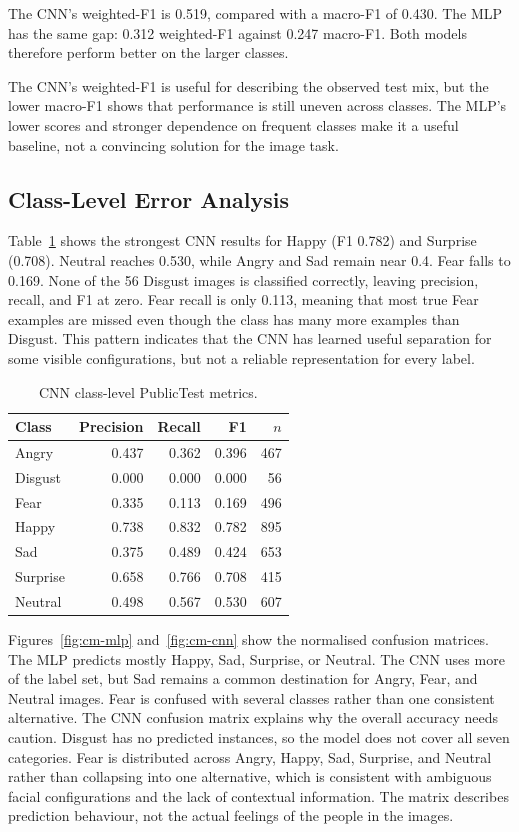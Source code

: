\documentclass[10pt,twocolumn]{article}
\begin{document}
The CNN's weighted-F1 is 0.519, compared with a macro-F1 of 0.430. The MLP has the same gap: 0.312 weighted-F1 against 0.247 macro-F1. Both models therefore perform better on the larger classes.

The CNN's weighted-F1 is useful for describing the observed test mix, but the lower macro-F1 shows that performance is still uneven across classes. The MLP's lower scores and stronger dependence on frequent classes make it a useful baseline, not a convincing solution for the image task.

\subsection{Class-Level Error Analysis}

Table~\ref{tab:perclass} shows the strongest CNN results for Happy (F1 0.782) and Surprise (0.708). Neutral reaches 0.530, while Angry and Sad remain near 0.4. Fear falls to 0.169. None of the 56 Disgust images is classified correctly, leaving precision, recall, and F1 at zero. Fear recall is only 0.113, meaning that most true Fear examples are missed even though the class has many more examples than Disgust. This pattern indicates that the CNN has learned useful separation for some visible configurations, but not a reliable representation for every label.
\begin{table}[t]
\centering
\caption{CNN class-level PublicTest metrics.}
\label{tab:perclass}
\begin{tabular}{lrrrr}
\toprule
Class & Precision & Recall & F1 & $n$ \\
\midrule
Angry & 0.437 & 0.362 & 0.396 & 467 \\
Disgust & 0.000 & 0.000 & 0.000 & 56 \\
Fear & 0.335 & 0.113 & 0.169 & 496 \\
Happy & 0.738 & 0.832 & 0.782 & 895 \\
Sad & 0.375 & 0.489 & 0.424 & 653 \\
Surprise & 0.658 & 0.766 & 0.708 & 415 \\
Neutral & 0.498 & 0.567 & 0.530 & 607 \\
\bottomrule
\end{tabular}
\end{table}

Figures~\ref{fig:cm-mlp} and~\ref{fig:cm-cnn} show the normalised confusion matrices. The MLP predicts mostly Happy, Sad, Surprise, or Neutral. The CNN uses more of the label set, but Sad remains a common destination for Angry, Fear, and Neutral images. Fear is confused with several classes rather than one consistent alternative.
The CNN confusion matrix explains why the overall accuracy needs caution. Disgust has no predicted instances, so the model does not cover all seven categories. Fear is distributed across Angry, Happy, Sad, Surprise, and Neutral rather than collapsing into one alternative, which is consistent with ambiguous facial configurations and the lack of contextual information. The matrix describes prediction behaviour, not the actual feelings of the people in the images.
\end{document}
